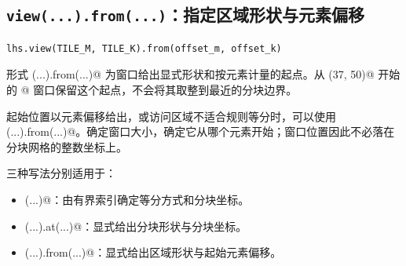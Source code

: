 \subsection*{\texttt{view(...).from(...)}：指定区域形状与元素偏移}

\begin{lstlisting}[language=croqtile,caption={view(...).from(...)：显式分块范围与显式元素偏移}]
lhs.view(TILE_M, TILE_K).from(offset_m, offset_k)
\end{lstlisting}

形式 \co@view(...).from(...)@ 为窗口给出显式形状和按元素计量的起点。从 \co@(37, 50)@ 开始的 \co@[16, 16]@ 窗口保留这个起点，不会将其取整到最近的分块边界。

起始位置以元素偏移给出，或访问区域不适合规则等分时，可以使用 \co@view(...).from(...)@。\co@view@ 确定窗口大小，\co@from@ 确定它从哪个元素开始；窗口位置因此不必落在分块网格的整数坐标上。

三种写法分别适用于：

\begin{itemize}[leftmargin=1.6em]
\item \co@chunkat(...)@：由有界索引确定等分方式和分块坐标。
\item \co@subspan(...).at(...)@：显式给出分块形状与分块坐标。
\item \co@view(...).from(...)@：显式给出区域形状与起始元素偏移。
\end{itemize}
